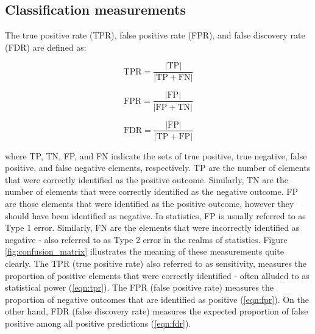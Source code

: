 \subsection{Classification measurements}
The true positive rate (TPR), false positive rate (FPR), and false discovery rate (FDR) are defined as:

\begin{equation}
\text{TPR}=\frac{|\text{TP}|}{|\text{TP}+\text{FN}|}
\label{eqn:tpr}
\end{equation}

\begin{equation}
\text{FPR}=\frac{|\text{FP}|}{|\text{FP}+\text{TN}|}
\label{eqn:fpr}
\end{equation}

\begin{equation}
\text{FDR}=\frac{|\text{FP}|}{|\text{TP}+\text{FP}|}
\label{eqn:fdr}
\end{equation}

where TP, TN, FP, and FN indicate the sets of true positive, true negative, false positive, and false negative elements, respectively. TP are the number of elements that were correctly identified as the positive outcome. Similarly, TN are the number of elements that were correctly identified as the negative outcome. FP are those elements that were identified as the positive outcome, however they should have been identified as negative. In statistics, FP is usually referred to as Type 1 error. Similarly, FN are the elements that were incorrectly identified as negative - also referred to as Type 2 error in the realms of statistics. Figure \ref{fig:confusion_matrix} illustrates the meaning of these measurements quite clearly. The TPR (true positive rate) also referred to as sensitivity, measures the proportion of positive elements that were correctly identified - often alluded to as statistical power (\ref{eqn:tpr}). The FPR (false positive rate) measures the proportion of negative outcomes that are identified as positive (\ref{eqn:fpr}). On the other hand, FDR (false discovery rate) measures the expected proportion of false positive among all positive predictions (\ref{eqn:fdr}). 

